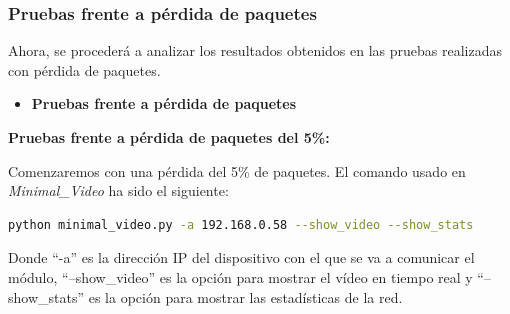 \subsubsection{Pruebas frente a pérdida de paquetes}

Ahora, se procederá a analizar los resultados obtenidos en las pruebas realizadas con pérdida de paquetes. 
\vspace{\baselineskip}
\begin{itemize}
  \item \textbf{Pruebas frente a pérdida de paquetes}
\end{itemize}

\textbf{Pruebas frente a pérdida de paquetes del 5\%:}
\vspace{\baselineskip}

Comenzaremos con una pérdida del 5\% de paquetes. El comando usado en \textit{Minimal\_Video} ha sido el siguiente:

\begin{lstlisting}[language=bash]
python minimal_video.py -a 192.168.0.58 --show_video --show_stats
\end{lstlisting}
Donde ``-a'' es la dirección IP del dispositivo con el que se va a comunicar el módulo, ``--show\_video'' es la opción para mostrar el vídeo en tiempo real y ``--show\_stats'' es la opción para mostrar las estadísticas de la red.
\vspace{\baselineskip}

